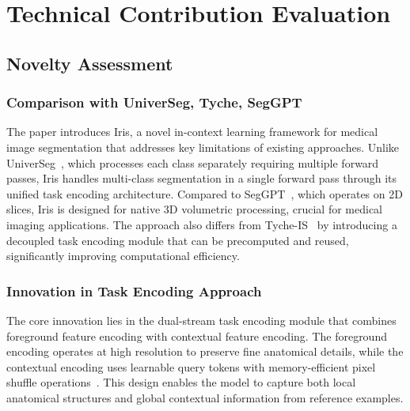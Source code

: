 \section{Technical Contribution Evaluation}
\label{sec:technical_contribution}

\subsection{Novelty Assessment}
\subsubsection{Comparison with UniverSeg, Tyche, SegGPT}
The paper introduces Iris, a novel in-context learning framework for medical image segmentation that addresses key limitations of existing approaches. Unlike UniverSeg~\cite{butoi2023universeg}, which processes each class separately requiring multiple forward passes, Iris handles multi-class segmentation in a single forward pass through its unified task encoding architecture. Compared to SegGPT~\cite{wang2023seggpt}, which operates on 2D slices, Iris is designed for native 3D volumetric processing, crucial for medical imaging applications. The approach also differs from Tyche-IS~\cite{rakic2024tyche} by introducing a decoupled task encoding module that can be precomputed and reused, significantly improving computational efficiency.

\subsubsection{Innovation in Task Encoding Approach}
The core innovation lies in the dual-stream task encoding module that combines foreground feature encoding with contextual feature encoding. The foreground encoding operates at high resolution to preserve fine anatomical details, while the contextual encoding uses learnable query tokens with memory-efficient pixel shuffle operations~\cite{shi2016real}. This design enables the model to capture both local anatomical structures and global contextual information from reference examples.


